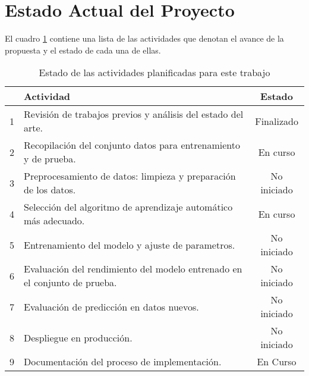 \section{Estado Actual del Proyecto}

El cuadro \ref{table:4} contiene una lista de las actividades que denotan el avance de la propuesta y el estado de cada una de
ellas.

\begin{center}
    \vspace{-\topsep}
    \begin{table}[h!]
        \begin{tabular}{ |c|l|c| }
            \hline
            & \bf Actividad & \bf Estado \\
            \hline
            1 & Revisión de trabajos previos y análisis del estado del arte. & Finalizado \\
            \hline
            2 & Recopilación del conjunto datos para entrenamiento y de prueba. & En curso \\
            \hline
            3 & Preprocesamiento de datos: limpieza y preparación de los datos. & No iniciado \\
            \hline
            4 & Selección del algoritmo de aprendizaje automático más adecuado. & En curso \\
            \hline
            5 & Entrenamiento del modelo y ajuste de parametros. & No iniciado \\
            \hline
            6 & Evaluación del rendimiento del modelo entrenado en el conjunto de prueba. & No iniciado \\
            \hline
            7 & Evaluación de predicción en datos nuevos. & No iniciado \\
            \hline
            8 & Despliegue en producción. & No iniciado \\
            \hline
            9 & Documentación del proceso de implementación. & En Curso \\
            \hline
        \end{tabular}
        \caption{Estado de las actividades planificadas para este trabajo}
        \label{table:4}
    \end{table}
    \vspace{-\topsep}
\end{center}
